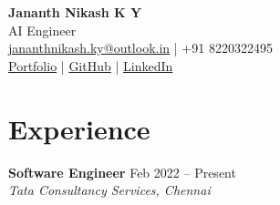 \documentclass[letterpaper,10pt]{article}
\begin{document}
\begin{center}
    {\LARGE \textbf{Jananth Nikash K Y}} \\
    AI Engineer \\
    \href{mailto:jananthnikash.ky@outlook.in}{jananthnikash.ky@outlook.in} \quad | \quad +91 8220322495 \\
    \href{https://jananthnikash.com}{Portfolio} \quad | \quad 
    \href{https://github.com/jananth-nikash-k-y}{GitHub} \quad | \quad 
    \href{https://linkedin.com/in/Jananth-Nikash-K-Y}{LinkedIn}
\end{center}

\vspace{-10pt}

\section*{Experience}

\textbf{Software Engineer} \hfill Feb 2022 -- Present \\
\textit{Tata Consultancy Services, Chennai}
\end{document}
